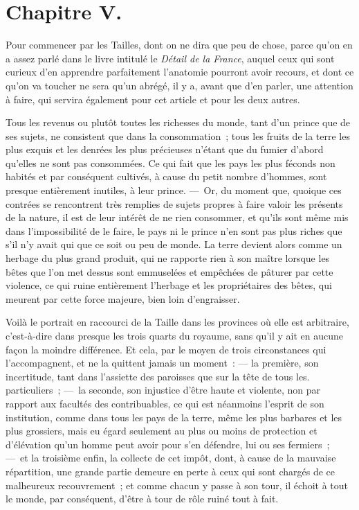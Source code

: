 \documentclass[french,twoside]{book} %
\begin{document}
\section[{Chapitre V.}]{Chapitre V.}
\noindent Pour commencer par les Tailles, dont on ne dira que peu de chose, parce qu’on en a assez parlé dans le livre intitulé le {\itshape Détail de la France}, auquel ceux qui sont curieux d’en apprendre parfaitement l’anatomie pourront avoir recours, et dont ce qu’on va toucher ne sera qu’un abrégé, il y a, avant que d’en parler, une attention à faire, qui servira également pour cet article et pour les deux autres.\par
Tous les revenus ou plutôt toutes les richesses du monde, tant d’un prince que de ses sujets, ne consistent que dans la consommation ; tous les fruits de la terre les plus exquis et les denrées les plus précieuses n’étant que du fumier d’abord qu’elles ne sont pas consommées. Ce qui fait que les pays les plus féconds non habités et par conséquent cultivés, à cause du petit nombre d’hommes, sont presque entièrement inutiles, à leur prince. — Or, du moment que, quoique ces contrées se rencontrent très remplies de sujets propres à faire valoir les présents de la nature, il est de leur intérêt de ne rien consommer, et qu’ils sont même mis dans l’impossibilité de le faire, le pays ni le prince n’en sont pas plus riches que s’il n’y avait qui que ce soit ou peu de monde. La terre devient alors comme un herbage du plus grand produit, qui ne rapporte rien à son maître lorsque les bêtes que l’on met dessus sont emmuselées et empêchées de pâturer par cette violence, ce qui ruine entièrement l’herbage et les propriétaires des bêtes, qui meurent par cette force majeure, bien loin d’engraisser.\par
Voilà le portrait en raccourci de la Taille dans les provinces où elle est arbitraire, c’est-à-dire dans presque les trois quarts du royaume, sans qu’il y ait en aucune façon la moindre différence. Et cela, par le moyen de trois circonstances qui l’accompagnent, et ne la quittent jamais un moment : — la première, son incertitude, tant dans l’assiette des paroisses que sur la tête de tous les. particuliers ; — la seconde, son injustice d’être haute et violente, non par rapport aux facultés des contribuables, ce qui est néanmoins l’esprit de son institution, comme dans tous les pays de la terre, même les plus barbares et les plus grossiers, mais eu égard seulement au plus ou moins de protection et d’élévation qu’un homme peut avoir pour s’en défendre, lui ou ses fermiers ; — et la troisième enfin, la collecte de cet impôt, dont, à cause de la mauvaise répartition, une grande partie demeure en perte à ceux qui sont chargés de ce malheureux recouvrement ; et comme chacun y passe à son tour, il échoit à tout le monde, par conséquent, d’être à tour de rôle ruiné tout à fait.\par
\end{document}
